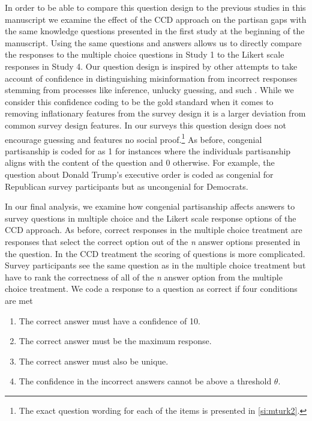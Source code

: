 \documentclass[12pt, letterpaper]{article}
\begin{document}
	In order to be able to compare this question design to the previous studies in this manuscript we examine the effect of the CCD approach on the partisan gaps with the same knowledge questions presented in the first study at the beginning of the manuscript. Using the same questions and answers allows us to directly compare the responses to the multiple choice questions in Study 1 to the Likert scale responses in Study 4. Our question design is inspired by other attempts to take account of confidence in distinguishing misinformation from incorrect responses stemming from processes like inference, unlucky guessing, and such  \citep[for instance,][]{pasek2015}. While we consider this confidence coding to be the gold standard when it comes to removing inflationary features from the survey design it is a larger deviation from common survey design features. In our surveys this question design does not encourage guessing and features no social proof.\footnote{The exact question wording for each of the items is presented in \cref{si:mturk2}.} As before, congenial partisanship is coded for as 1 for instances where the individuals partisanship aligns with the content of the question and 0 otherwise. For example, the question about Donald Trump's executive order is coded as congenial for Republican survey participants but as uncongenial for Democrats.
	
	In our final analysis, we examine how congenial partisanship affects answers to survey questions in multiple choice and the Likert scale response options of the CCD approach. As before, correct responses in the multiple choice treatment are responses that select the correct option out of the \emph{n} answer options presented in the question. In the CCD treatment the scoring of questions is more complicated. Survey participants see the same question as in the multiple choice treatment but have to rank the correctness of all of the \emph{n} answer option from the multiple choice treatment. We code a response to a question as correct if four conditions are met
	
	\begin{enumerate}
		\item The correct answer must have a confidence of 10.
		\item The correct answer must be the maximum response.
		\item The correct answer must also be unique.
		\item The confidence in the incorrect answers cannot be above a threshold \(\theta\).
	\end{enumerate}
	
\end{document}

